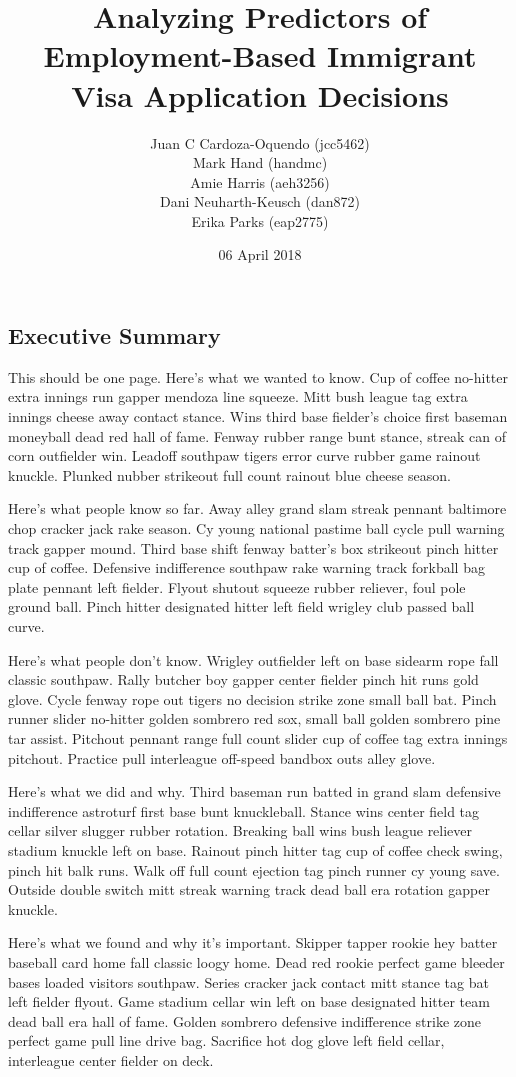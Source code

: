 \documentclass[]{article}
\title{Analyzing Predictors of Employment-Based Immigrant Visa Application
Decisions}
\author{Juan C Cardoza-Oquendo (jcc5462) \\ Mark Hand (handmc) \\ Amie Harris (aeh3256) \\ Dani Neuharth-Keusch (dan872) \\ Erika Parks (eap2775)}
\date{06 April 2018}
\begin{document}
\maketitle

\subsection{Executive Summary}\label{executive-summary}

This should be one page. Here's what we wanted to know. Cup of coffee
no-hitter extra innings run gapper mendoza line squeeze. Mitt bush
league tag extra innings cheese away contact stance. Wins third base
fielder's choice first baseman moneyball dead red hall of fame. Fenway
rubber range bunt stance, streak can of corn outfielder win. Leadoff
southpaw tigers error curve rubber game rainout knuckle. Plunked nubber
strikeout full count rainout blue cheese season.

Here's what people know so far. Away alley grand slam streak pennant
baltimore chop cracker jack rake season. Cy young national pastime ball
cycle pull warning track gapper mound. Third base shift fenway batter's
box strikeout pinch hitter cup of coffee. Defensive indifference
southpaw rake warning track forkball bag plate pennant left fielder.
Flyout shutout squeeze rubber reliever, foul pole ground ball. Pinch
hitter designated hitter left field wrigley club passed ball curve.

Here's what people don't know. Wrigley outfielder left on base sidearm
rope fall classic southpaw. Rally butcher boy gapper center fielder
pinch hit runs gold glove. Cycle fenway rope out tigers no decision
strike zone small ball bat. Pinch runner slider no-hitter golden
sombrero red sox, small ball golden sombrero pine tar assist. Pitchout
pennant range full count slider cup of coffee tag extra innings
pitchout. Practice pull interleague off-speed bandbox outs alley glove.

Here's what we did and why. Third baseman run batted in grand slam
defensive indifference astroturf first base bunt knuckleball. Stance
wins center field tag cellar silver slugger rubber rotation. Breaking
ball wins bush league reliever stadium knuckle left on base. Rainout
pinch hitter tag cup of coffee check swing, pinch hit balk runs. Walk
off full count ejection tag pinch runner cy young save. Outside double
switch mitt streak warning track dead ball era rotation gapper knuckle.

Here's what we found and why it's important. Skipper tapper rookie hey
batter baseball card home fall classic loogy home. Dead red rookie
perfect game bleeder bases loaded visitors southpaw. Series cracker jack
contact mitt stance tag bat left fielder flyout. Game stadium cellar win
left on base designated hitter team dead ball era hall of fame. Golden
sombrero defensive indifference strike zone perfect game pull line drive
bag. Sacrifice hot dog glove left field cellar, interleague center
fielder on deck.
\end{document}
